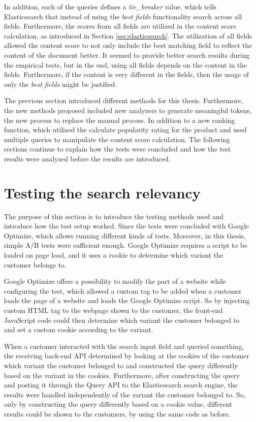 In addition, each of the queries defines a \emph{tie\_breaker} value, which tells Elasticsearch 
that instead of using the \emph{best fields} functionality search across all fields.
Furthermore, the scores from all fields are utilized in the content score calculation, as introduced 
in Section \ref{sec:elasticsearch}.
The utilization of all fields allowed the content score to not only include the best matching field to
reflect the content of the document better.
It seemed to provide better search results during the empirical tests, but in the end, using all
fields depends on the content in the fields.
Furthermore, if the content is very different in the fields, then the usage of only the \emph{best fields}
might be justified.


The previous section introduced different methods for this thesis.
Furthermore, the new methods proposed included new analyzers to generate meaningful tokens, 
the new process to replace the manual process.
In addition to a new ranking function, which utilized the calculate popularity rating for the product
and used multiple queries to manipulate the content score calculation.
The following sections continue to explain how the tests were concluded and how the test results 
were analyzed before the results are introduced.


\section{Testing the search relevancy}
\label{sec:methodTests}

The purpose of this section is to introduce the testing methods used and introduce how the test setup worked.
Since the tests were concluded with Google Optimize, which allows running different kinds of tests.
Moreover, in this thesis, simple A/B tests were sufficient enough. 
Google Optimize requires a script to be loaded on page load, and it uses a cookie to determine 
which variant the customer belongs to.

Google Optimize offers a possibility to modify the part of a website while configuring the test, 
which allowed a custom tag to be added when a customer loads the page 
of a website and loads the Google Optimize script.
So by injecting custom HTML tag to the webpage shown to the customer, the front-end JavaScript code could then
determine which variant the customer belonged to and set a custom cookie according to the variant.

When a customer interacted with the search input field and queried something, the receiving back-end
API determined by looking at the cookies of the customer which variant the customer belonged to and constructed the query differently
based on the variant in the cookies.
Furthermore, after constructing the query and posting it through the Query API to the Elasticsearch search engine, 
the results were handled independently of the variant the customer belonged to.
So, only by constructing the query differently based on a cookie value, different results could be shown 
to the customers, by using the same code as before.


